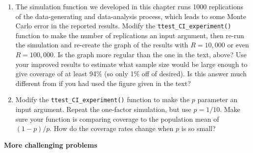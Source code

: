 \documentclass[
]{book}
\begin{document}
\begin{enumerate}
\def\labelenumi{\arabic{enumi}.}
\item
  The simulation function we developed in this chapter runs 1000 replications of the data-generating and data-analysis process, which leads to some Monte Carlo error in the reported results. Modify the \texttt{ttest\_CI\_experiment()} function to make the number of replications an input argument, then re-run the simulation and re-create the graph of the results with \(R=10,000\) or even \(R=100,000\). Is the graph more regular than the one in the text, above?
  Use your improved results to estimate what sample size would be large enough to give coverage of at least 94\% (so only 1\% off of desired).
  Is this answer much different from if you had used the figure given in the text?
\item
  Modify the \texttt{ttest\_CI\_experiment()} function to make the \(p\) parameter an input argument. Repeat the one-factor simulation, but use \(p = 1/10\). Make sure your function is comparing coverage to the population mean of \((1 - p) / p\). How do the coverage rates change when \(p\) is so small?
\end{enumerate}

\textbf{More challenging problems}
\end{document}
